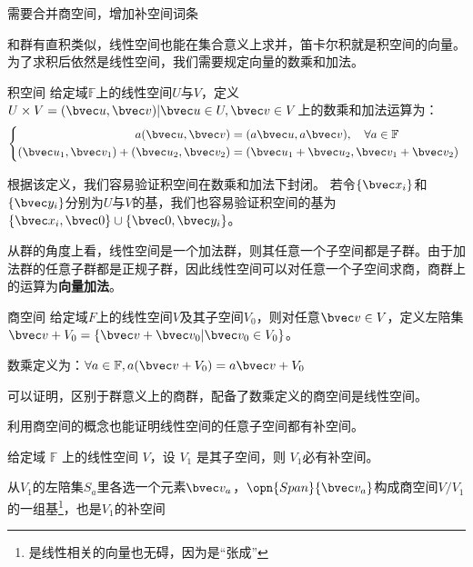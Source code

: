 

\begin{issues}
\issueDraft 
需要合并商空间，增加补空间词条
\end{issues}
和群有直积类似，线性空间也能在集合意义上求并，笛卡尔积就是积空间的向量。为了求积后依然是线性空间，我们需要规定向量的数乘和加法。

\begin{definition}{积空间}
给定域$\mathbb F $上的线性空间$U$与$V$，定义$U\times V={(\bvec u,\bvec v)|\bvec u\in U,\bvec v\in V}$上的数乘和加法运算为：
\begin{equation}
\left\{\begin{aligned}
a(\bvec u,\bvec v)&=(a\bvec u,a\bvec v),\quad \forall a\in \mathbb F\\
(\bvec u_1,\bvec v_1)+(\bvec u_2,\bvec v_2)&=(\bvec u_1+\bvec u_2,\bvec v_1+\bvec v_2)
\end{aligned}\right.~
\end{equation}
\end{definition}
根据该定义，我们容易验证积空间在数乘和加法下封闭。
若令$\{\bvec x_i\}$和$\{\bvec y_i\}$分别为$U$与$V$的基，我们也容易验证积空间的基为$\{\bvec x_i,\bvec 0\}\cup \{\bvec 0,\bvec y_i\}$。

从群的角度上看，线性空间是一个加法群，则其任意一个子空间都是子群。由于加法群的任意子群都是正规子群，因此线性空间可以对任意一个子空间求商，商群上的运算为\textbf{向量加法}。
\begin{definition}{商空间}
给定域$F$上的线性空间$V$及其子空间$V_0$，则对任意$\bvec v\in V$，定义左陪集$\bvec v+V_0=\{\bvec v+\bvec v_0|\bvec v_0\in V_0\}$。

数乘定义为：$\forall a\in \mathbb F,a(\bvec v+V_0)=a\bvec v+V_0$
\end{definition}
可以证明，区别于群意义上的商群，配备了数乘定义的商空间是线性空间。

利用商空间的概念也能证明线性空间的任意子空间都有补空间。
\begin{theorem}{}
给定域 $\mathbb F$ 上的线性空间 $V$，设 $V_1$ 是其子空间，则 $V_1$必有补空间。
\end{theorem}
从$V_1$的左陪集${S_a}$里各选一个元素$\bvec v_a$，$\opn{Span} \{\bvec v_a\}$构成商空间$V/V_1$的一组基\footnote{是线性相关的向量也无碍，因为是“张成”}，也是$V_1$的补空间